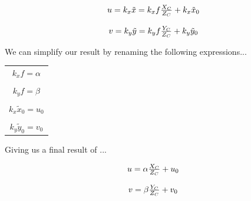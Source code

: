 \documentclass[]{article}
\begin{document}
\begin{center}
\begin{equation}
\begin{tabular}{c}
  $u = k_x\tilde{x} = k_xf\frac{X_C}{Z_C} + k_x\tilde{x}_0$\\
  \\
  $v = k_y\tilde{y} = k_yf\frac{Y_C}{Z_C} + k_y\tilde{y}_0$
\end{tabular}
\end{equation}
\end{center}

We can simplify our result by renaming the following expressions...
\begin{center}
\begin{tabular}{c}
$k_xf = \alpha$\\
\\
$k_yf = \beta$\\
\\
$k_x\tilde{x}_0 = u_0$\\
\\
$k_y\tilde{y}_0 = v_0$
\end{tabular}
\end{center}

Giving us a final result of ...

\begin{center}
\begin{equation}
\begin{tabular}{c}
  $u = \alpha\frac{X_C}{Z_C} + u_0$\\
  \\
  $v = \beta\frac{Y_C}{Z_C} + v_0$
\end{tabular}
\end{equation}
\end{center}
\end{document}
